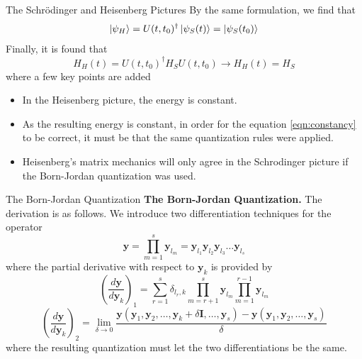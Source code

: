 \documentclass[aspectratio=169]{beamer}
\begin{document}
\begin{frame}[allowframebreaks]{The Schrödinger and Heisenberg Pictures}
		\framebreak
		By the same formulation, we find that
		\begin{equation}
			\ket{\psi_H}=U(t,t_0)^\dagger\ket{\psi_S(t)}=\ket{\psi_S(t_0)}
		\end{equation}
		Finally, it is found that
		\begin{equation}
			H_H(t)=U(t,t_0)^\dagger H_S U(t,t_0)\longrightarrow \boxed{H_H(t)=H_S}\label{eqn:constancy}
		\end{equation}
		where a few key points are added
		\begin{itemize}
			\item In the Heisenberg picture, the energy is constant.
			\item As the resulting energy is constant, in order for the equation \ref{eqn:constancy} to be correct, it must be that the same quantization rules were applied.
			\item Heisenberg's matrix mechanics will only agree in the Schrodinger picture if the Born-Jordan quantization was used.
		\end{itemize}
	\end{frame}
	
	\begin{frame}{The Born-Jordan Quantization}
		\textbf{The Born-Jordan Quantization.} The derivation is as follows. We introduce two differentiation techniques for the operator%
		\begin{equation}
			\textbf{y}=\prod_{m=1}^s\textbf{y}_{l_m}=\textbf{y}_{l_1}\textbf{y}_{l_2}\textbf{y}_{l_3}\ldots\textbf{y}_{l_s}
		\end{equation}
		where the partial derivative with respect to $\textbf{y}_k$ is provided by
		\begin{equation}
			\left(\frac{d\textbf{y}}{d\textbf{y}_k}\right)_1=\sum_{r=1}^{s}\delta_{l_r,k}\prod_{m=r+1}^{s}\textbf{y}_{l_m}\prod_{m=1}^{r-1}\textbf{y}_{l_m}
		\end{equation}
		\begin{equation}
			\left(\frac{d\textbf{y}}{d\textbf{y}_k}\right)_2=\lim_{\delta\to0}\frac{\textbf{y}(\textbf{y}_1,\textbf{y}_2,\ldots,\textbf{y}_k+\delta\textbf{I},\ldots,\textbf{y}_s)-\textbf{y}(\textbf{y}_1,\textbf{y}_2,\ldots,\textbf{y}_s)}{\delta}
		\end{equation}
		where the resulting quantization must let the two differentiations be the same. 
	\end{frame}
	
\end{document}
